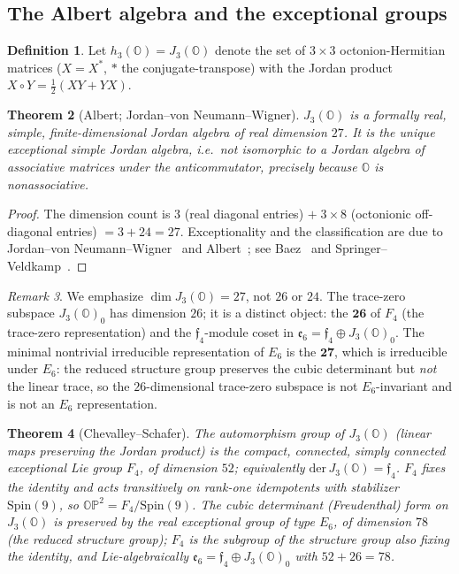 \documentclass[aps,prresearch,onecolumn,amsmath,amssymb,nofootinbib]{revtex4-2}
\theoremstyle{plain}\newtheorem{theorem}{Theorem}[section]\newtheorem{proposition}[theorem]{Proposition}\newtheorem{lemma}[theorem]{Lemma}\newtheorem{corollary}[theorem]{Corollary}
\theoremstyle{definition}\newtheorem{definition}[theorem]{Definition}\newtheorem{conjecture}[theorem]{Conjecture}
\theoremstyle{remark}\newtheorem{remark}[theorem]{Remark}
\begin{document}
\subsection{The Albert algebra and the exceptional groups}

\begin{definition}
Let $h_3(\mathbb{O})=J_3(\mathbb{O})$ denote the set of $3\times3$ octonion-Hermitian matrices ($X=X^{*}$, $*$ the conjugate-transpose) with the Jordan product $X\circ Y=\tfrac12(XY+YX)$.
\end{definition}

\begin{theorem}[Albert; Jordan--von Neumann--Wigner]
\label{thm:albert}
$J_3(\mathbb{O})$ is a formally real, simple, finite-dimensional Jordan algebra of real dimension $27$. It is the unique \emph{exceptional} simple Jordan algebra, i.e.\ not isomorphic to a Jordan algebra of associative matrices under the anticommutator, precisely because $\mathbb{O}$ is nonassociative.
\end{theorem}

\begin{proof}
The dimension count is $3$ (real diagonal entries) $+\;3\times8$ (octonionic off-diagonal entries) $=3+24=27$. Exceptionality and the classification are due to Jordan--von Neumann--Wigner~\cite{JvNW1934} and Albert~\cite{Albert1934}; see Baez~\cite[Sec.~3]{Baez2002} and Springer--Veldkamp~\cite[Ch.~5]{SpringerVeldkamp2000}.
\end{proof}

\begin{remark}
We emphasize $\dim J_3(\mathbb{O})=27$, not $26$ or $24$. The trace-zero subspace $J_3(\mathbb{O})_0$ has dimension $26$; it is a distinct object: the $\mathbf{26}$ of $F_4$ (the trace-zero representation) and the $\mathfrak{f}_4$-module coset in $\mathfrak{e}_6=\mathfrak{f}_4\oplus J_3(\mathbb{O})_0$. The minimal nontrivial irreducible representation of $E_6$ is the $\mathbf{27}$, which is irreducible under $E_6$: the reduced structure group preserves the cubic determinant but \emph{not} the linear trace, so the $26$-dimensional trace-zero subspace is not $E_6$-invariant and is not an $E_6$ representation.
\end{remark}

\begin{theorem}[Chevalley--Schafer]
\label{thm:f4e6}
The automorphism group of $J_3(\mathbb{O})$ (linear maps preserving the Jordan product) is the compact, connected, simply connected exceptional Lie group $F_4$, of dimension $52$; equivalently $\mathrm{der}\,J_3(\mathbb{O})=\mathfrak{f}_4$. $F_4$ fixes the identity and acts transitively on rank-one idempotents with stabilizer $\mathrm{Spin}(9)$, so $\mathbb{OP}^2=F_4/\mathrm{Spin}(9)$. The cubic determinant (Freudenthal) form on $J_3(\mathbb{O})$ is preserved by the real exceptional group of type $E_6$, of dimension $78$ (the reduced structure group); $F_4$ is the subgroup of the structure group also fixing the identity, and Lie-algebraically $\mathfrak{e}_6=\mathfrak{f}_4\oplus J_3(\mathbb{O})_0$ with $52+26=78$.
\end{theorem}
\end{document}
